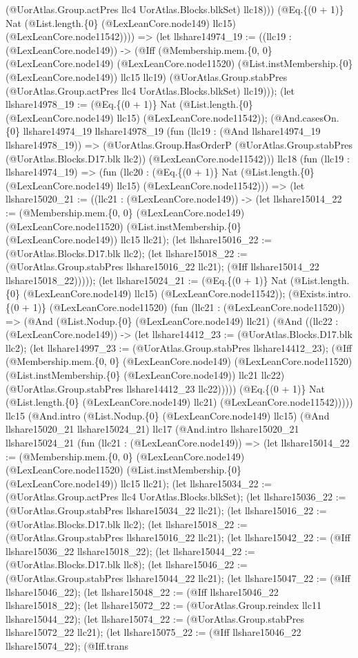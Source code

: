 \documentclass[11pt]{article}
\begin{document}
(@UorAtlas.Group.actPres llc4 UorAtlas.Blocks.blkSet) llc18))) (@Eq.\{(0 + 1)\} Nat (@List.length.\{0\} (@LexLeanCore.node149) llc15) (@LexLeanCore.node11542)))) => (let llshare14974\_19 := ((llc19 : (@LexLeanCore.node149)) -> (@Iff (@Membership.mem.\{0, 0\} (@LexLeanCore.node149) (@LexLeanCore.node11520) (@List.instMembership.\{0\} (@LexLeanCore.node149)) llc15 llc19) (@UorAtlas.Group.stabPres (@UorAtlas.Group.actPres llc4 UorAtlas.Blocks.blkSet) llc19))); (let llshare14978\_19 := (@Eq.\{(0 + 1)\} Nat (@List.length.\{0\} (@LexLeanCore.node149) llc15) (@LexLeanCore.node11542)); (@And.casesOn.\{0\} llshare14974\_19 llshare14978\_19 (fun (llc19 : (@And llshare14974\_19 llshare14978\_19)) => (@UorAtlas.Group.HasOrderP (@UorAtlas.Group.stabPres (@UorAtlas.Blocks.D17.blk llc2)) (@LexLeanCore.node11542))) llc18 (fun (llc19 : llshare14974\_19) => (fun (llc20 : (@Eq.\{(0 + 1)\} Nat (@List.length.\{0\} (@LexLeanCore.node149) llc15) (@LexLeanCore.node11542))) => (let llshare15020\_21 := ((llc21 : (@LexLeanCore.node149)) -> (let llshare15014\_22 := (@Membership.mem.\{0, 0\} (@LexLeanCore.node149) (@LexLeanCore.node11520) (@List.instMembership.\{0\} (@LexLeanCore.node149)) llc15 llc21); (let llshare15016\_22 := (@UorAtlas.Blocks.D17.blk llc2); (let llshare15018\_22 := (@UorAtlas.Group.stabPres llshare15016\_22 llc21); (@Iff llshare15014\_22 llshare15018\_22))))); (let llshare15024\_21 := (@Eq.\{(0 + 1)\} Nat (@List.length.\{0\} (@LexLeanCore.node149) llc15) (@LexLeanCore.node11542)); (@Exists.intro.\{(0 + 1)\} (@LexLeanCore.node11520) (fun (llc21 : (@LexLeanCore.node11520)) => (@And (@List.Nodup.\{0\} (@LexLeanCore.node149) llc21) (@And ((llc22 : (@LexLeanCore.node149)) -> (let llshare14412\_23 := (@UorAtlas.Blocks.D17.blk llc2); (let llshare14997\_23 := (@UorAtlas.Group.stabPres llshare14412\_23); (@Iff (@Membership.mem.\{0, 0\} (@LexLeanCore.node149) (@LexLeanCore.node11520) (@List.instMembership.\{0\} (@LexLeanCore.node149)) llc21 llc22) (@UorAtlas.Group.stabPres llshare14412\_23 llc22))))) (@Eq.\{(0 + 1)\} Nat (@List.length.\{0\} (@LexLeanCore.node149) llc21) (@LexLeanCore.node11542))))) llc15 (@And.intro (@List.Nodup.\{0\} (@LexLeanCore.node149) llc15) (@And llshare15020\_21 llshare15024\_21) llc17 (@And.intro llshare15020\_21 llshare15024\_21 (fun (llc21 : (@LexLeanCore.node149)) => (let llshare15014\_22 := (@Membership.mem.\{0, 0\} (@LexLeanCore.node149) (@LexLeanCore.node11520) (@List.instMembership.\{0\} (@LexLeanCore.node149)) llc15 llc21); (let llshare15034\_22 := (@UorAtlas.Group.actPres llc4 UorAtlas.Blocks.blkSet); (let llshare15036\_22 := (@UorAtlas.Group.stabPres llshare15034\_22 llc21); (let llshare15016\_22 := (@UorAtlas.Blocks.D17.blk llc2); (let llshare15018\_22 := (@UorAtlas.Group.stabPres llshare15016\_22 llc21); (let llshare15042\_22 := (@Iff llshare15036\_22 llshare15018\_22); (let llshare15044\_22 := (@UorAtlas.Blocks.D17.blk llc8); (let llshare15046\_22 := (@UorAtlas.Group.stabPres llshare15044\_22 llc21); (let llshare15047\_22 := (@Iff llshare15046\_22); (let llshare15048\_22 := (@Iff llshare15046\_22 llshare15018\_22); (let llshare15072\_22 := (@UorAtlas.Group.reindex llc11 llshare15044\_22); (let llshare15074\_22 := (@UorAtlas.Group.stabPres llshare15072\_22 llc21); (let llshare15075\_22 := (@Iff llshare15046\_22 llshare15074\_22); (@Iff.trans 
\end{document}

